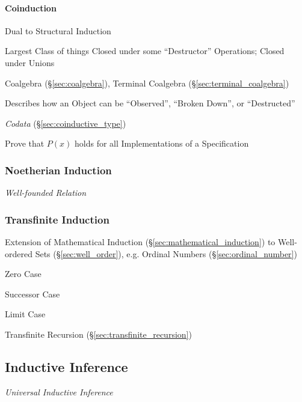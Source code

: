 \paragraph{Coinduction}\label{sec:coinduction}\hfill

Dual to Structural Induction

Largest Class of things Closed under some ``Destructor'' Operations;
Closed under Unions \cite{shulman11}

Coalgebra (\S\ref{sec:coalgebra}), Terminal Coalgebra
(\S\ref{sec:terminal_coalgebra})

Describes how an Object can be ``Observed'', ``Broken Down'', or
``Destructed''

\emph{Codata} (\S\ref{sec:coinductive_type})

Prove that $P(x)$ holds for all Implementations of a Specification



\subsubsection{Noetherian Induction}\label{sec:noetherian_induction}

\emph{Well-founded Relation}



\subsubsection{Transfinite Induction}\label{sec:transfinite_induction}

Extension of Mathematical Induction
(\S\ref{sec:mathematical_induction}) to Well-ordered Sets
(\S\ref{sec:well_order}), e.g. Ordinal Numbers
(\S\ref{sec:ordinal_number})

Zero Case

Successor Case

Limit Case

Transfinite Recursion (\S\ref{sec:transfinite_recursion})



\subsection{Inductive Inference}\label{sec:inductive_inference}
\cite{hawthorne08}

\emph{Universal Inductive Inference}

